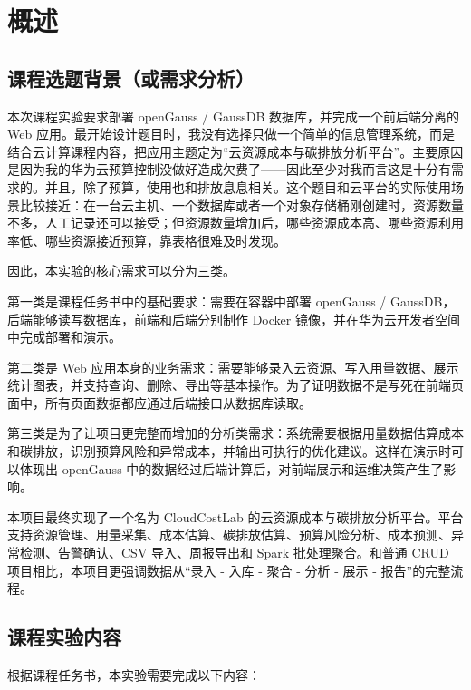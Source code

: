 \chapter{概述}\label{ux6982ux8ff0}

\section{课程选题背景（或需求分析）}\label{ux8bfeux7a0bux9009ux9898ux80ccux666fux6216ux9700ux6c42ux5206ux6790}

本次课程实验要求部署 openGauss / GaussDB 数据库，并完成一个前后端分离的
Web
应用。最开始设计题目时，我没有选择只做一个简单的信息管理系统，而是结合云计算课程内容，把应用主题定为``云资源成本与碳排放分析平台''。主要原因是因为我的华为云预算控制没做好造成欠费了------因此至少对我而言这是十分有需求的。并且，除了预算，使用也和排放息息相关。这个题目和云平台的实际使用场景比较接近：在一台云主机、一个数据库或者一个对象存储桶刚创建时，资源数量不多，人工记录还可以接受；但资源数量增加后，哪些资源成本高、哪些资源利用率低、哪些资源接近预算，靠表格很难及时发现。

因此，本实验的核心需求可以分为三类。

第一类是课程任务书中的基础要求：需要在容器中部署 openGauss /
GaussDB，后端能够读写数据库，前端和后端分别制作 Docker
镜像，并在华为云开发者空间中完成部署和演示。

第二类是 Web
应用本身的业务需求：需要能够录入云资源、写入用量数据、展示统计图表，并支持查询、删除、导出等基本操作。为了证明数据不是写死在前端页面中，所有页面数据都应通过后端接口从数据库读取。

第三类是为了让项目更完整而增加的分析类需求：系统需要根据用量数据估算成本和碳排放，识别预算风险和异常成本，并输出可执行的优化建议。这样在演示时可以体现出
openGauss 中的数据经过后端计算后，对前端展示和运维决策产生了影响。

本项目最终实现了一个名为 CloudCostLab
的云资源成本与碳排放分析平台。平台支持资源管理、用量采集、成本估算、碳排放估算、预算风险分析、成本预测、异常检测、告警确认、CSV
导入、周报导出和 Spark 批处理聚合。和普通 CRUD
项目相比，本项目更强调数据从``录入 - 入库 - 聚合 - 分析 - 展示 -
报告''的完整流程。

\section{课程实验内容}\label{ux8bfeux7a0bux5b9eux9a8cux5185ux5bb9}

根据课程任务书，本实验需要完成以下内容：

